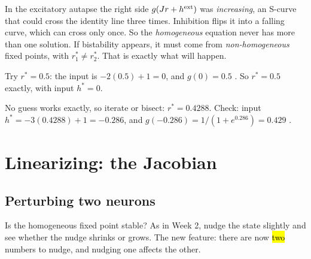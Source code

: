 \begin{intuition}
In the excitatory autapse the right side $g(Jr+h^{\text{ext}})$ was \emph{increasing}, an S-curve that could cross the identity line three times. Inhibition flips it into a falling curve, which can cross only once.
So the \emph{homogeneous} equation never has more than one solution. If bistability appears, it must come from \emph{non-homogeneous} fixed points, with $r_1^*\neq r_2^*$. That is exactly what will happen.
\end{intuition}

\begin{example}[The book's Fig.\ 2.11 parameters: $\theta=0$, $\beta=5$, $J=2$, $\hext=1$]
Try $r^*=0.5$: the input is $-2(0.5)+1=0$, and $g(0)=0.5$ \checkmark. So $r^*=0.5$ exactly, with input $h^*=0$.
\end{example}

\begin{example}[The book's Fig.\ 2.12 parameters: $\theta=0$, $\beta=1$, $\hext=1$, $J=3$]
No guess works exactly, so iterate or bisect: $r^*=0.4288$. Check: input $h^*=-3(0.4288)+1=-0.286$, and $g(-0.286)=1/(1+e^{0.286})=0.429$ \checkmark.
\end{example}

\section{Linearizing: the Jacobian}

\subsection{Perturbing two neurons}

Is the homogeneous fixed point stable? As in Week 2, nudge the state slightly and see whether the nudge shrinks or grows. The new feature: there are now \hl{two} numbers to nudge, and nudging one affects the other.

